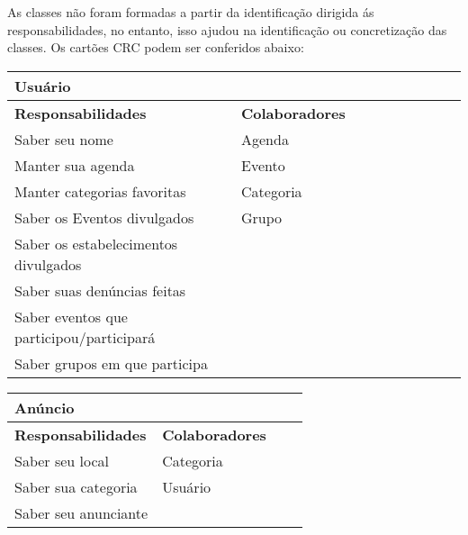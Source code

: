 \documentclass{article}
\begin{document}
\pagebreak


As classes não foram formadas a partir da identificação dirigida ás responsabilidades, no entanto, isso ajudou na identificação ou concretização das classes. Os cartões CRC podem ser conferidos abaixo:

\textcolor{red}{
\begin{center}
 \begin{tabular}{|p{0.5\linewidth}|p{0.5\linewidth}|}
  \hline
  \multicolumn{2}{|p{\textwidth}|}{
   {\large \textbf{Usuário}}} \\
  \hline
  \textbf{Responsabilidades} & \textbf{Colaboradores} \\ 
  \hline
  Saber seu nome &  Agenda \\
  \hline
  Manter sua agenda & Evento \\
  \hline
  Manter categorias favoritas & Categoria \\
  \hline
  Saber os Eventos divulgados & Grupo  \\
  \hline
  Saber os estabelecimentos divulgados &  \\
  \hline
  Saber suas denúncias feitas &  \\
  \hline
  Saber eventos que participou/participará &  \\
  \hline
  Saber grupos em que participa & \\  
  \hline
 \end{tabular} 
\end{center}
}
\textcolor{red}{
    \begin{center}
   	 \begin{tabular}{|p{0.5\linewidth}|p{0.5\linewidth}|}
\hline
 	\multicolumn{2}{|p{\textwidth}|}{
{\large \textbf{Anúncio}}
}  \\
\hline
\textbf{Responsabilidades} & \textbf{Colaboradores} \\ 
\hline
  	Saber seu local & Categoria  \\
  	\hline
  	Saber sua categoria & Usuário \\
  	\hline
  	Saber seu anunciante &  \\
  	\hline
   	\end{tabular} 
    \end{center}
}
    
\end{document}
